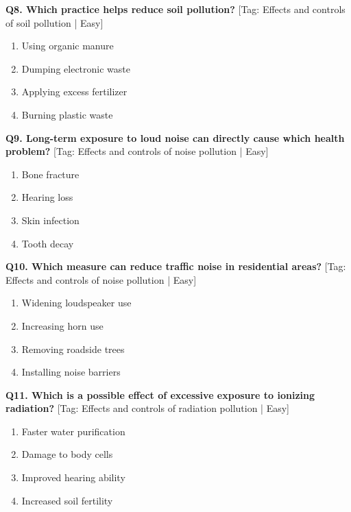 \noindent\textbf{Q8. Which practice helps reduce soil pollution?} \hfill [Tag: Effects and controls of soil pollution | Easy]
\begin{enumerate}[label=(\alph*),topsep=2pt,itemsep=1pt,partopsep=0pt,parsep=0pt]
    \item {Using organic manure}
    \item {Dumping electronic waste}
    \item {Applying excess fertilizer}
    \item {Burning plastic waste}
\end{enumerate}
\vspace{2mm}

\noindent\textbf{Q9. Long-term exposure to loud noise can directly cause which health problem?} \hfill [Tag: Effects and controls of noise pollution | Easy]
\begin{enumerate}[label=(\alph*),topsep=2pt,itemsep=1pt,partopsep=0pt,parsep=0pt]
    \item {Bone fracture}
    \item {Hearing loss}
    \item {Skin infection}
    \item {Tooth decay}
\end{enumerate}
\vspace{2mm}

\noindent\textbf{Q10. Which measure can reduce traffic noise in residential areas?} \hfill [Tag: Effects and controls of noise pollution | Easy]
\begin{enumerate}[label=(\alph*),topsep=2pt,itemsep=1pt,partopsep=0pt,parsep=0pt]
    \item {Widening loudspeaker use}
    \item {Increasing horn use}
    \item {Removing roadside trees}
    \item {Installing noise barriers}
\end{enumerate}
\vspace{2mm}

\noindent\textbf{Q11. Which is a possible effect of excessive exposure to ionizing radiation?} \hfill [Tag: Effects and controls of radiation pollution | Easy]
\begin{enumerate}[label=(\alph*),topsep=2pt,itemsep=1pt,partopsep=0pt,parsep=0pt]
    \item {Faster water purification}
    \item {Damage to body cells}
    \item {Improved hearing ability}
    \item {Increased soil fertility}
\end{enumerate}
\vspace{2mm}

